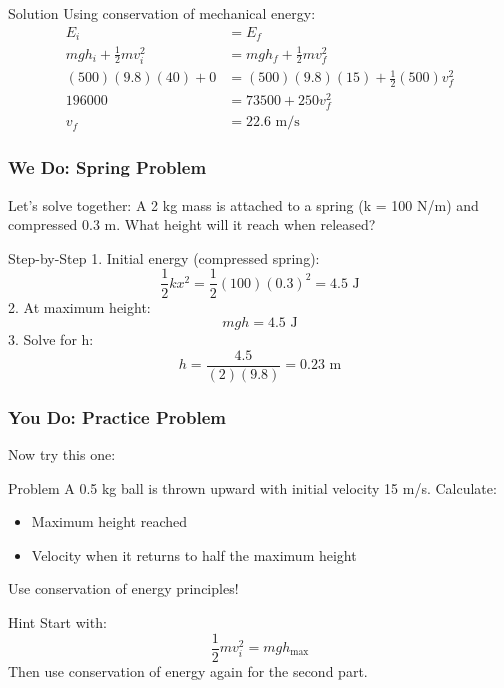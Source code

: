 \documentclass{beamer}
\begin{document}
\begin{frame}
\begin{block}{Solution}
Using conservation of mechanical energy:
\begin{align*}
E_i &= E_f \\
mgh_i + \frac{1}{2}mv_i^2 &= mgh_f + \frac{1}{2}mv_f^2 \\
(500)(9.8)(40) + 0 &= (500)(9.8)(15) + \frac{1}{2}(500)v_f^2 \\
196000 &= 73500 + 250v_f^2 \\
v_f &= 22.6 \text{ m/s}
\end{align*}
\end{block}
\end{frame}

\begin{frame}
\frametitle{We Do: Spring Problem}
Let's solve together: A 2 kg mass is attached to a spring (k = 100 N/m) and compressed 0.3 m. What height will it reach when released?
\end{frame}

\begin{frame}
\begin{block}{Step-by-Step}
1. Initial energy (compressed spring):
\[\frac{1}{2}kx^2 = \frac{1}{2}(100)(0.3)^2 = 4.5 \text{ J}\]
2. At maximum height:
\[mgh = 4.5 \text{ J}\]
3. Solve for h:
\[h = \frac{4.5}{(2)(9.8)} = 0.23 \text{ m}\]
\end{block}
\end{frame}

\begin{frame}
\frametitle{You Do: Practice Problem}
Now try this one:

\begin{block}{Problem}
A 0.5 kg ball is thrown upward with initial velocity 15 m/s. Calculate:
\begin{itemize}
    \item Maximum height reached
    \item Velocity when it returns to half the maximum height
\end{itemize}
Use conservation of energy principles!
\end{block}
\pause
\begin{block}{Hint}
Start with:
\[\frac{1}{2}mv_i^2 = mgh_{\text{max}}\]
Then use conservation of energy again for the second part.
\end{block}
\end{frame}
\end{document}
